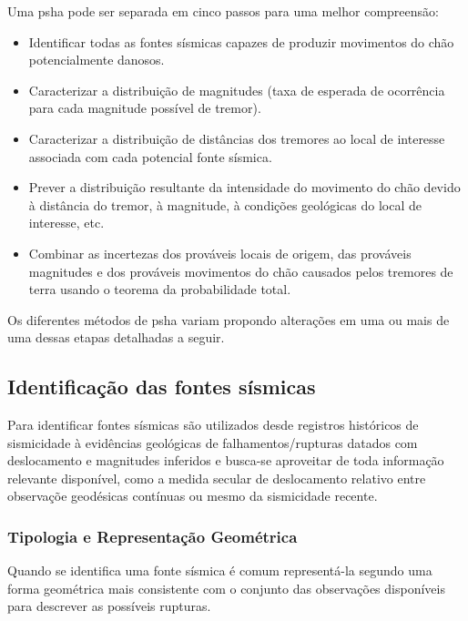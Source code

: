 Uma \gls{psha} pode ser separada em cinco passos para uma melhor compreensão:

\begin{itemize}
\item Identificar todas as fontes sísmicas capazes de produzir movimentos do chão potencialmente danosos.
\item Caracterizar a distribuição de magnitudes (taxa de esperada de ocorrência para cada magnitude possível de tremor).
\item Caracterizar a distribuição de distâncias dos tremores ao local de interesse associada com cada potencial fonte
sísmica.
\item Prever a distribuição resultante da intensidade do movimento do chão devido à distância do tremor, à
magnitude, à condições geológicas do local de interesse, etc.
\item Combinar as incertezas dos prováveis locais de origem, das prováveis magnitudes e dos prováveis movimentos
do chão causados pelos tremores de terra usando o teorema da probabilidade total.
\end{itemize}

Os diferentes métodos de \gls{psha} variam propondo alterações em uma ou mais de uma dessas etapas detalhadas a seguir.

\subsection{Identificação das fontes sísmicas}
\label{sec:psha_sources}


Para identificar fontes sísmicas são utilizados desde registros históricos de sismicidade à evidências geológicas de
falhamentos/rupturas datados com deslocamento e magnitudes inferidos e busca-se aproveitar de toda informação relevante
disponível, como a medida secular de deslocamento relativo entre observaçõe geodésicas contínuas ou mesmo da sismicidade recente.


\subsubsection{Tipologia e Representação Geométrica}
\label{sec:fontes_tipologia}

Quando se identifica uma fonte sísmica é comum representá-la segundo uma forma geométrica mais consistente com o
conjunto das observações disponíveis para descrever as possíveis rupturas.

